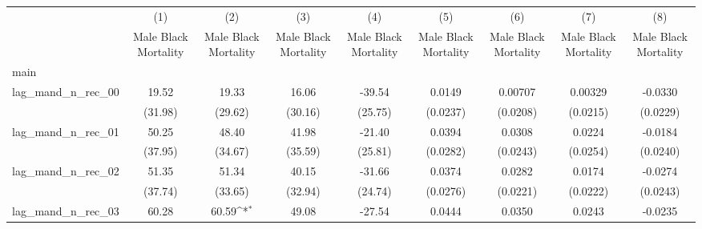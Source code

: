 {
\def\sym#1{\ifmmode^{#1}\else\(^{#1}\)\fi}
\begin{longtable}{l*{8}{c}}
\hline\hline\endfirsthead\hline\endhead\hline\endfoot\endlastfoot
                    &\multicolumn{1}{c}{(1)}&\multicolumn{1}{c}{(2)}&\multicolumn{1}{c}{(3)}&\multicolumn{1}{c}{(4)}&\multicolumn{1}{c}{(5)}&\multicolumn{1}{c}{(6)}&\multicolumn{1}{c}{(7)}&\multicolumn{1}{c}{(8)}\\
                    &\multicolumn{1}{c}{Male Black Mortality}&\multicolumn{1}{c}{Male Black Mortality}&\multicolumn{1}{c}{Male Black Mortality}&\multicolumn{1}{c}{Male Black Mortality}&\multicolumn{1}{c}{Male Black Mortality}&\multicolumn{1}{c}{Male Black Mortality}&\multicolumn{1}{c}{Male Black Mortality}&\multicolumn{1}{c}{Male Black Mortality}\\
\hline
main                &                     &                     &                     &                     &                     &                     &                     &                     \\
lag\_mand\_n\_rec\_00   &       19.52         &       19.33         &       16.06         &      -39.54         &      0.0149         &     0.00707         &     0.00329         &     -0.0330         \\
                    &     (31.98)         &     (29.62)         &     (30.16)         &     (25.75)         &    (0.0237)         &    (0.0208)         &    (0.0215)         &    (0.0229)         \\
[1em]
lag\_mand\_n\_rec\_01   &       50.25         &       48.40         &       41.98         &      -21.40         &      0.0394         &      0.0308         &      0.0224         &     -0.0184         \\
                    &     (37.95)         &     (34.67)         &     (35.59)         &     (25.81)         &    (0.0282)         &    (0.0243)         &    (0.0254)         &    (0.0240)         \\
[1em]
lag\_mand\_n\_rec\_02   &       51.35         &       51.34         &       40.15         &      -31.66         &      0.0374         &      0.0282         &      0.0174         &     -0.0274         \\
                    &     (37.74)         &     (33.65)         &     (32.94)         &     (24.74)         &    (0.0276)         &    (0.0221)         &    (0.0222)         &    (0.0243)         \\
[1em]
lag\_mand\_n\_rec\_03   &       60.28         &       60.59\sym{*}  &       49.08         &      -27.54         &      0.0444         &      0.0350         &      0.0243         &     -0.0235         \\

\end{longtable}}
